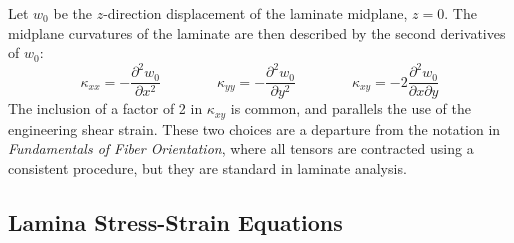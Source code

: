 \documentclass[11pt]{article}
\begin{document}
Let $w_0$ be the $z$-direction displacement of the laminate midplane, $z = 0$.  The midplane curvatures of the laminate are then described by the second derivatives of $w_0$:
\begin{equation}
   \kappa_{xx} = -\frac{\partial^2 w_0}{\partial x^2}   \qquad  \qquad
   \kappa_{yy} = -\frac{\partial^2 w_0}{\partial y^2}   \qquad  \qquad
   \kappa_{xy} = -2\frac{\partial ^2 w_0}{\partial x \partial y}
   \label{kappaDef}
\end{equation}
The inclusion of a factor of 2 in $\kappa_{xy}$ is common, and parallels the use of the engineering shear strain.  These two choices are a departure from the notation in \emph{Fundamentals of Fiber Orientation}, where all tensors are contracted using a consistent procedure, but they are standard in laminate analysis.  


\subsection*{Lamina Stress-Strain Equations}
\end{document}
